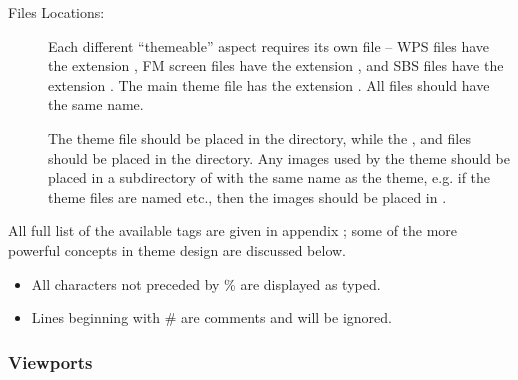 \begin{description}
\item [Files Locations: ] Each different ``themeable'' aspect requires its own file --
  WPS files have the extension , FM screen files have the extension
  , and SBS files have the extension . The main theme
  file has the extension . All files should have the same name.

  The theme  file should be placed in the 
  directory, while the ,  and  files should
  be placed in the  directory. Any images used by the
  theme should be placed in a subdirectory of  with the
  same name as the theme, e.g. if the theme files are named
   etc., then the images should be placed in
  .
\end{description}

All full list of the available tags are given in appendix
; some of the more powerful concepts in theme design
are discussed below.

\begin{itemize}
\item All characters not preceded by \% are displayed as typed.
\item Lines beginning with \# are comments and will be ignored.
\end{itemize}


\subsubsection{\label{ref:Viewports}Viewports}

